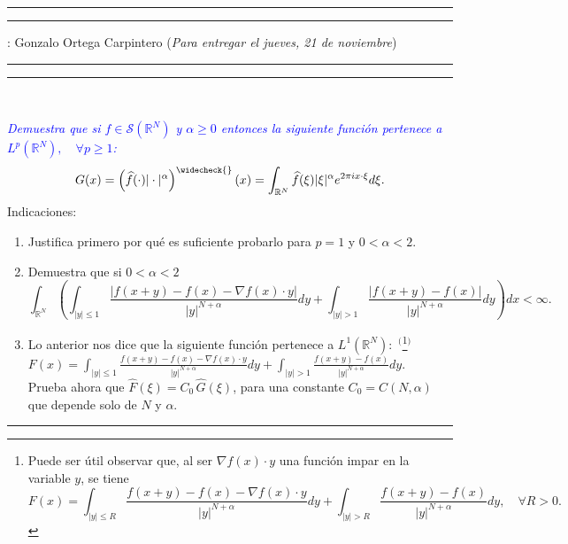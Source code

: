 \documentclass[11pt,a4paper]{article}
\newcommand{\blue}{\textcolor{blue}}
\begin{document}
\hrule\hrule
\vspace{2mm}


\vspace{3mm}

 : Gonzalo Ortega Carpintero \hfill ({\small \it Para entregar el jueves, 21 de noviembre})

\vspace{2mm}

\hrule\hrule

\vspace{2mm}

\

 \blue{\em Demuestra que si $f\in\mathscr{S}(\mathbb R^N)$ y $\alpha\ge 0$ entonces la siguiente función pertenece a   $L^p(\mathbb R^N), \quad \forall p\ge 1$:
$$
G(x)=\left(\widehat f(\cdot)|\cdot|^\alpha\right)^{\widecheck{}}(x)=\int_{\mathbb R^N}
\widehat f(\xi)|\xi|^\alpha e^{2\pi ix\cdot\xi}d\xi.
$$}
\vskip -2mm
{\sc Indicaciones}: 
\begin{enumerate}
\item Justifica primero por qué es suficiente probarlo para  $p=1$ y $0<\alpha<2$. 
\item Demuestra que si $0<\alpha<2$ 
$$\displaystyle\int_{\mathbb R^N}\left(\int_{|y|\le 1}\frac{|f(x+y)-f(x)-\nabla f(x)\cdot y|}{|y|^{N+\alpha}}dy+
\int_{|y|>1}\frac{|f(x+y)-f(x)|}{|y|^{N+\alpha}}dy\right)dx<\infty.$$ 

\item  Lo anterior nos dice que la siguiente función  pertenece a $L^1(\mathbb R^N):$ ${}^($\footnote{ Puede ser útil observar que, al ser 
$\nabla f(x)\cdot y$ una función impar en la variable  $y$, se tiene $$F(x)=\displaystyle\int_{|y|\le R}\frac{f(x+y)-f(x)-\nabla f(x)\cdot y}{|y|^{N+\alpha}}dy+
\int_{|y|>R}\frac{f(x+y)-f(x)}{|y|^{N+\alpha}}dy, \quad \forall R>0.$$}${}^)$
 \\[2mm]
$F(x)=\displaystyle\int_{|y|\le 1}\frac{f(x+y)-f(x)-\nabla f(x)\cdot y}{|y|^{N+\alpha}}dy+
\int_{|y|>1}\frac{f(x+y)-f(x)}{|y|^{N+\alpha}}dy.$    \\[1mm]
Prueba ahora que $\widehat F(\xi)=C_0\,\widehat G(\xi)$, para una constante $C_0=C(N,\alpha)$ que depende solo de  $N$ y $\alpha$.
\end{enumerate}
\vskip 6mm
\hrule
\vskip 5mm
\end{document}
